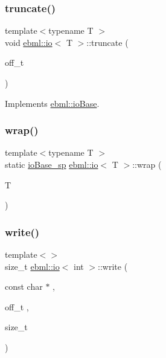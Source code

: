 \subsubsection{\texorpdfstring{truncate()}{truncate()}\hspace{0.1cm}{\footnotesize\ttfamily [2/2]}}
{\footnotesize\ttfamily template$<$typename T $>$ \\
void \mbox{\hyperlink{classebml_1_1io}{ebml\+::io}}$<$ T $>$\+::truncate (\begin{DoxyParamCaption}\item[{off\+\_\+t}]{ }\end{DoxyParamCaption})\hspace{0.3cm}{\ttfamily [virtual]}}



Implements \mbox{\hyperlink{classebml_1_1ioBase_ae1a40372ba926becab957ae0b054492e}{ebml\+::io\+Base}}.

\mbox{\label{classebml_1_1io_a722fbb02777e4af8e42779750c588f63}} 
\subsubsection{\texorpdfstring{wrap()}{wrap()}}
{\footnotesize\ttfamily template$<$typename T $>$ \\
static \mbox{\hyperlink{namespaceebml_a7bb59128ac6af27e47367938a846b569}{io\+Base\+\_\+sp}} \mbox{\hyperlink{classebml_1_1io}{ebml\+::io}}$<$ T $>$\+::wrap (\begin{DoxyParamCaption}\item[{T}]{ }\end{DoxyParamCaption})\hspace{0.3cm}{\ttfamily [static]}}

\mbox{\label{classebml_1_1io_aedbdf5a69ee0ae64f909a59645cd0db7}} 
\subsubsection{\texorpdfstring{write()}{write()}\hspace{0.1cm}{\footnotesize\ttfamily [1/2]}}
{\footnotesize\ttfamily template$<$$>$ \\
size\+\_\+t \mbox{\hyperlink{classebml_1_1io}{ebml\+::io}}$<$ int $>$\+::write (\begin{DoxyParamCaption}\item[{const char $\ast$}]{,  }\item[{off\+\_\+t}]{,  }\item[{size\+\_\+t}]{ }\end{DoxyParamCaption})\hspace{0.3cm}{\ttfamily [virtual]}}



